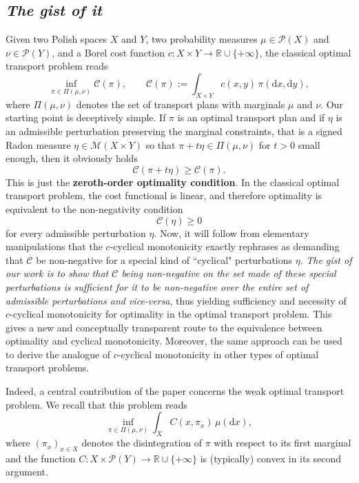 \documentclass[leqno, 11pt, a4paper]{amsart}
\theoremstyle{definition}
\newcommand{\R}{\mathbb{R}}
\newcommand{\C}{\mathscr{C}}
\newcommand{\cP}{\mathcal{P}}
\newcommand{\cM}{\mathcal{M}}
\newcommand{\dd}{\mathrm{d}}
\newcommand{\extendedR}{\R \cup \{+\infty\}}
\begin{document}
\subsection{\textit{The gist of it}}
Given two Polish spaces $X$ and $Y$, two probability measures $\mu \in \cP(X)$ and $\nu \in \cP(Y)$, and a Borel cost function $c:X\times Y\to \extendedR$, the classical optimal transport problem reads
$$
\inf_{\pi \in \Pi(\mu, \nu)}  \C(\pi), \qquad \C(\pi) :=  \int_{X \times Y} c(x, y)\, \pi(\dd x, \dd y),
$$
where $\Pi(\mu,\nu)$ denotes the set of transport plans with marginals $\mu$ and $\nu$. Our starting point is deceptively simple. If $\pi$ is an optimal transport plan and if $\eta$ is an admissible perturbation preserving the marginal constraints, that is a signed Radon measure $\eta \in \cM(X \times Y)$ so that $\pi + t\eta \in \Pi(\mu, \nu)$ for $t>0$ small enough, then it obviously holds
$$
\C(\pi+t\eta)\geq \C(\pi).
$$
This is just the \textbf{zeroth-order optimality condition}. In the classical optimal transport problem, the cost functional is linear, and therefore optimality is equivalent to the non-negativity condition
$$
\C(\eta)\geq 0
$$
for every admissible perturbation $\eta$. Now, it will follow from elementary manipulations that the $c$-cyclical monotonicity exactly rephrases as demanding that $\C$ be non-negative for a special kind of ``cyclical" perturbations $\eta$. \textit{The gist of our work is to show that $\C$ being non-negative on the set made of these special perturbations is sufficient for it to be non-negative over the entire set of admissible perturbations and \textit{vice-versa}}, thus yielding sufficiency and necessity of $c$-cyclical monotonicity for optimality in the optimal transport problem. This gives a new and conceptually transparent route to the equivalence between optimality and cyclical monotonicity. Moreover, the same approach can be used to derive the analogue of $c$-cyclical monotonicity in other types of optimal transport problems.

Indeed, a central contribution of the paper concerns the weak optimal transport problem. We recall that this problem reads
$$
\inf_{\pi\in\Pi(\mu,\nu)}
\int_X C(x,\pi_x)\,\mu(\dd x),
$$
where $(\pi_x)_{x\in X}$ denotes the disintegration of $\pi$ with respect to its first marginal and the function $C:X\times \cP(Y)\to \extendedR$ is (typically) convex in its second argument.
\end{document}
